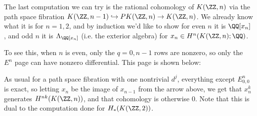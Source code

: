 \documentclass[12pt,oneside]{amsart}
\begin{document}
%
%

The last computation we can try is the rational cohomology of $K(\ZZ,n)$ via the path space fibration $K(\ZZ,n-1) \hookrightarrow PK(\ZZ,n) \to K(\ZZ,n)$. We already know what it is for $n = 1,2$, and by induction we'd like to show for even $n$ it is $\QQ[x_n]$, and odd $n$ it is $\Lambda_\QQ[x_n]$ (i.e. the exterior algebra) for $x_n \in H^n(K(\ZZ,n);\QQ)$.

To see this, when $n$ is even, only the $q = 0,n-1$ rows are nonzero, so only the $E^{n}$ page can have nonzero differential. This page is shown below:

\begin{center}
\end{center}

As usual for a path space fibration with one nontrivial $d^j$, everything except $E^n_{0,0}$ is exact, so letting $x_n$ be the image of $x_{n-1}$ from the arrow above, we get that $x_n^k$ generates $H^{nk}(K(\ZZ,n))$, and that cohomology is otherwise $0$. Note that this is dual to the computation done for $H_*(K(\ZZ,2))$.
\end{document}
